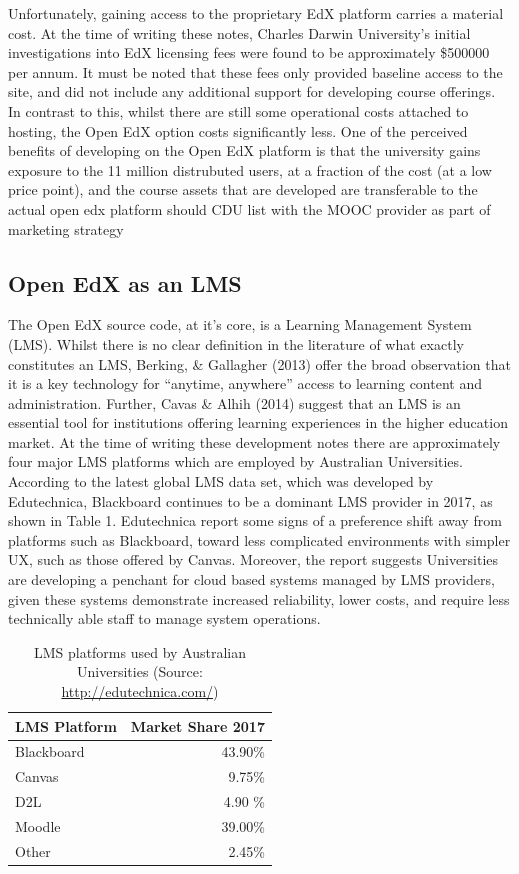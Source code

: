 \documentclass[a4paper]{article}
\begin{document}
Unfortunately, gaining access to the proprietary EdX platform carries a material cost. At the time of writing these notes, Charles Darwin University's initial investigations into EdX licensing fees were found to be approximately \$500000 per annum. It must be noted that these fees only provided baseline access to the site, and did not include any additional support for developing course offerings. In contrast to this, whilst there are still some operational costs attached to hosting, the Open EdX option costs significantly less. One of the perceived benefits of developing on the Open EdX platform is that the university gains exposure to the 11 million distrubuted users, at a fraction of the cost (at a low price point), and the course assets that are developed are transferable to the actual open edx platform should CDU list with the MOOC provider as part of marketing strategy

\subsection{Open EdX as an LMS}
The Open EdX source code, at it's core, is a Learning Management System (LMS). Whilst there is no clear definition in the literature of what exactly constitutes an LMS, Berking, \& Gallagher (2013) offer the broad observation that it is a key technology for ``anytime, anywhere'' access to learning content and administration. Further, Cavas \& Alhih (2014) suggest that an LMS is an essential tool for institutions offering learning experiences in the higher education market. At the time of writing these development notes there are approximately four major LMS platforms which are employed by Australian Universities. According to the latest global LMS data set, which was developed by Edutechnica, Blackboard continues to be a dominant LMS provider in 2017, as shown in Table 1. Edutechnica report some signs of a preference shift away from platforms such as Blackboard, toward less complicated environments with simpler UX, such as those offered by Canvas. Moreover, the report suggests Universities are developing a penchant for cloud based systems managed by LMS providers, given these systems demonstrate increased reliability, lower costs, and require less technically able staff to manage system operations.

\begin{table}[h]
\centering
\caption{LMS platforms used by Australian Universities (Source: \url{http://edutechnica.com/})}
\vspace{0.1cm}
\begin{tabular}{lr}
\toprule
\textbf{LMS Platform} & \textbf{Market Share 2017}\\
\midrule
Blackboard & 43.90\%\\
Canvas & 9.75\%\\
D2L & 4.90 \%\\
Moodle & 39.00\%\\
Other & 2.45\%\\
\bottomrule
\end{tabular}
\end{table}
\end{document}
